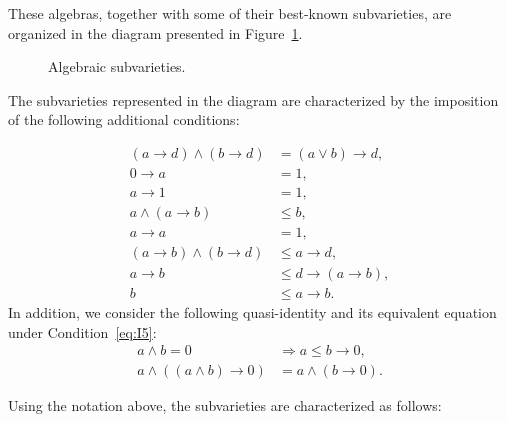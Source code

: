 \documentclass{article}
\begin{document}
These algebras, together with some of their best-known subvarieties, are organized in the diagram presented in Figure~\ref{fig:varieties}. 

\begin{figure}[ht]
\centering
{}
\caption{Algebraic subvarieties.}
\label{fig:varieties}
\end{figure}

The subvarieties represented in the diagram are characterized by the imposition of the following
additional conditions:

\begin{align}
(a \to d) \wedge (b \to d) &= (a \lor b) \to d,
    \tag{I2}\label{eq:I2}\\
0 \to a &= 1,
    \tag{I3}\label{eq:I3}\\
a \to 1 &= 1,
    \tag{I4}\label{eq:I4}\\
a \wedge (a \to b) &\le b,
    \tag{I5}\label{eq:I5}\\
a \to a &= 1,
    \tag{I6}\label{eq:I6}\\
(a \to b) \wedge (b \to d) &\le a \to d,
    \tag{I7}\label{eq:I7}\\
a \to b &\le d \to (a \to b),
    \tag{I8}\label{eq:I8}\\
b &\le a \to b.
    \tag{I9}\label{eq:I9}
\end{align}
In addition, we consider the following quasi-identity and its equivalent equation under Condition~\eqref{eq:I5}:
\begin{align}
a \wedge b = 0 &\Longrightarrow a \le b \to 0,
    \tag{A}\label{eq:A}\\
a \wedge ((a \wedge b)\to 0) &= a \wedge (b \to 0).
    \tag{A'}\label{eq:Aprime}
\end{align}

Using the notation above, the subvarieties are characterized as follows:
\end{document}
